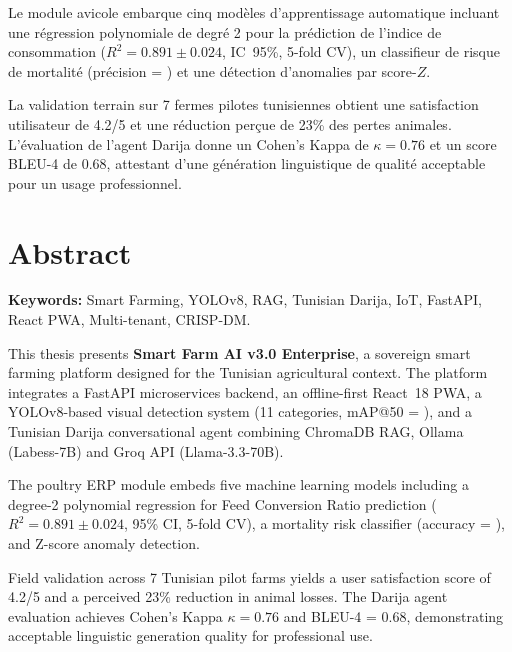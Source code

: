 Le module avicole embarque cinq modèles d'apprentissage automatique incluant
une régression polynomiale de degré 2 pour la prédiction de l'indice de
consommation ($R^2 = 0.891 \pm 0.024$, IC~95\%, 5-fold CV), un classifieur
de risque de mortalité (précision = ) et une détection
d'anomalies par score-$Z$.

La validation terrain sur 7 fermes pilotes tunisiennes obtient une satisfaction
utilisateur de 4.2/5 et une réduction perçue de 23\% des pertes animales.
L'évaluation de l'agent Darija donne un Cohen's Kappa de $\kappa = 0.76$
et un score BLEU-4 de 0.68, attestant d'une génération linguistique de
qualité acceptable pour un usage professionnel.

\chapter*{Abstract}
\begin{tcolorbox}[colback=gray!5,colframe=gray!50]
\textbf{Keywords:} Smart Farming, YOLOv8, RAG, Tunisian Darija,
IoT, FastAPI, React PWA, Multi-tenant, CRISP-DM.
\end{tcolorbox}

\medskip
This thesis presents \textbf{Smart Farm AI v3.0 Enterprise}, a sovereign
smart farming platform designed for the Tunisian agricultural context.
The platform integrates a FastAPI microservices backend, an offline-first
React~18 PWA, a YOLOv8-based visual detection system (11 categories,
mAP@50 = ), and a Tunisian Darija conversational
agent combining ChromaDB RAG, Ollama (Labess-7B) and Groq API (Llama-3.3-70B).

The poultry ERP module embeds five machine learning models including a
degree-2 polynomial regression for Feed Conversion Ratio prediction
($R^2 = 0.891 \pm 0.024$, 95\% CI, 5-fold CV), a mortality risk
classifier (accuracy = ), and Z-score anomaly detection.

Field validation across 7 Tunisian pilot farms yields a user satisfaction
score of 4.2/5 and a perceived 23\% reduction in animal losses.
The Darija agent evaluation achieves Cohen's Kappa $\kappa = 0.76$ and
BLEU-4 = 0.68, demonstrating acceptable linguistic generation quality
for professional use.

\setcounter{page}{1}


